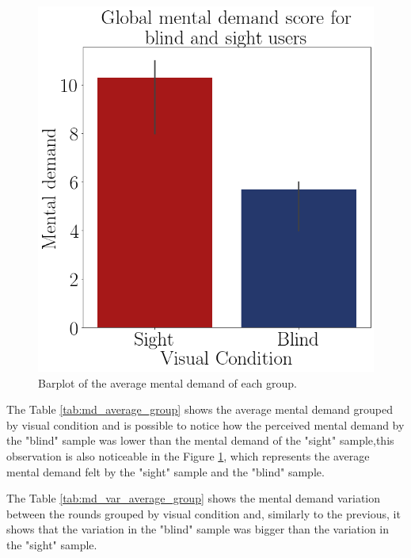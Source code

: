 \begin{figure}[!htb]
\begin{minipage}{.45\linewidth}
        \vspace{1.8cm}
        \centering
        \includegraphics[width = \linewidth]{Resultados/Nasa/Figuras/png/barplot_md_avg_global.png}
        \caption{Barplot of the average mental demand of each group.}
        \label{fig:barplot_md_global}
    \end{minipage}
\end{figure}

The Table \ref{tab:md_average_group} shows the average mental demand grouped by visual condition and is possible to notice how the perceived mental demand by the "blind" sample was lower than the mental demand of the "sight" sample,this observation is also noticeable in the Figure \ref{fig:barplot_md_global}, which represents the average mental demand felt by the "sight" sample and the "blind" sample.

The Table \ref{tab:md_var_average_group} shows the mental demand variation between the rounds grouped by visual condition and, similarly to the previous, it shows that the variation in the "blind" sample was bigger than the variation in the "sight" sample. 

